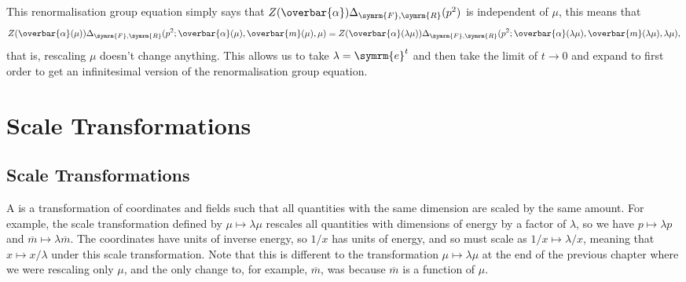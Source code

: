 \documentclass[fleqn]{NotesClass}
\newcommand{\e}{\symrm{e}}
\newcommand{\feynman}{\symrm{F}}
\newcommand{\renormalised}{\symrm{R}}
\begin{document}
    This renormalisation group equation simply says that \(Z(\overbar{\alpha})\Delta_{\feynman,\renormalised}(p^2)\) is independent of \(\mu\), this means that
    \begin{equation}
        Z(\overbar{\alpha}(\mu)) \Delta_{\feynman,\renormalised}(p^2; \overbar{\alpha}(\mu), \overbar{m}(\mu), \mu) = Z(\overbar{\alpha}(\lambda \mu))\Delta_{\feynman,\renormalised}(p^2; \overbar{\alpha}(\lambda\mu), \overbar{m}(\lambda\mu), \lambda\mu),
    \end{equation}
    that is, rescaling \(\mu\) doesn't change anything.
    This allows us to take \(\lambda = \e^{t}\) and then take the limit of \(t \to 0\) and expand to first order to get an infinitesimal version of the renormalisation group equation.
    
    \chapter{Scale Transformations}
    \section{Scale Transformations}
    A  is a transformation of coordinates and fields such that all quantities with the same dimension are scaled by the same amount.
    For example, the scale transformation defined by \(\mu \mapsto \lambda \mu\) rescales all quantities with dimensions of energy by a factor of \(\lambda\), so we have \(p \mapsto \lambda p\) and \(\overbar{m} \mapsto \lambda \overbar{m}\).
    The coordinates have units of inverse energy, so \(1/x\) has units of energy, and so must scale as \(1/x \mapsto \lambda/x\), meaning that \(x \mapsto x/\lambda\) under this scale transformation.
    Note that this is different to the transformation \(\mu \mapsto \lambda \mu\) at the end of the previous chapter where we were rescaling only \(\mu\), and the only change to, for example, \(\overbar{m}\), was because \(\overbar{m}\) is a function of \(\mu\).
    
\end{document}
